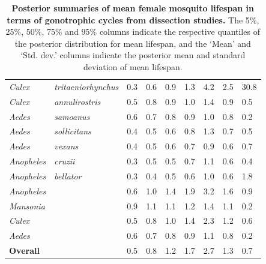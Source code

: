 \documentclass[12pt]{article}
\begin{document}
\begin{table}[htbp]
\begin{tabular}{l|l|l|l|l|l|l|l|l}
		\textit{Culex} & \textit{tritaeniorhynchus} & 0.3 & 0.6 & 0.9 & 1.3 & 4.2 & 2.5 & 30.8 \\
		\textit{Culex} & \textit{annulirostris} & 0.5 & 0.8 & 0.9 & 1.0 & 1.4 & 0.9 & 0.5 \\
		\textit{Aedes} & \textit{samoanus} & 0.6 & 0.7 & 0.8 & 0.9 & 1.0 & 0.8 & 0.2 \\
		\textit{Aedes} & \textit{sollicitans} & 0.4 & 0.5 & 0.6 & 0.8 & 1.3 & 0.7 & 0.5 \\
		\textit{Aedes} & \textit{vexans} & 0.4 & 0.5 & 0.6 & 0.7 & 0.9 & 0.6 & 0.7 \\
		\textit{Anopheles} & \textit{cruzii} & 0.3 & 0.5 & 0.5 & 0.7 & 1.1 & 0.6 & 0.4 \\
		\textit{Anopheles} & \textit{bellator} & 0.3 & 0.4 & 0.5 & 0.6 & 1.0 & 0.6 & 1.8 \\
		\hline
		\textit{Anopheles} & \textit{} & 0.6 & 1.0 & 1.4 & 1.9 & 3.2 & 1.6 & 0.9 \\
		\textit{Mansonia} & \textit{} & 0.9 & 1.1 & 1.1 & 1.2 & 1.4 & 1.1 & 0.2 \\
		\textit{Culex} & \textit{} & 0.5 & 0.8 & 1.0 & 1.4 & 2.3 & 1.2 & 0.6 \\
		\textit{Aedes} & \textit{} & 0.6 & 0.7 & 0.8 & 0.9 & 1.1 & 0.8 & 0.2 \\
		\hline
		\textbf{Overall} & \textit{} & 0.5 & 0.8 & 1.2 & 1.7 & 2.7 & 1.3 & 0.7 \\
	\end{tabular}
	\caption{\textbf{Posterior summaries of mean female mosquito lifespan in terms of gonotrophic cycles from dissection studies.} The 5\%, 25\%, 50\%, 75\% and 95\% columns indicate the respective quantiles of the posterior distribution for mean lifespan, and the `Mean' and `Std. dev.' columns indicate the posterior mean and standard deviation of mean lifespan.}
	\label{tab:dissection_estimated_lifespans}%
\end{table}
\end{document}
